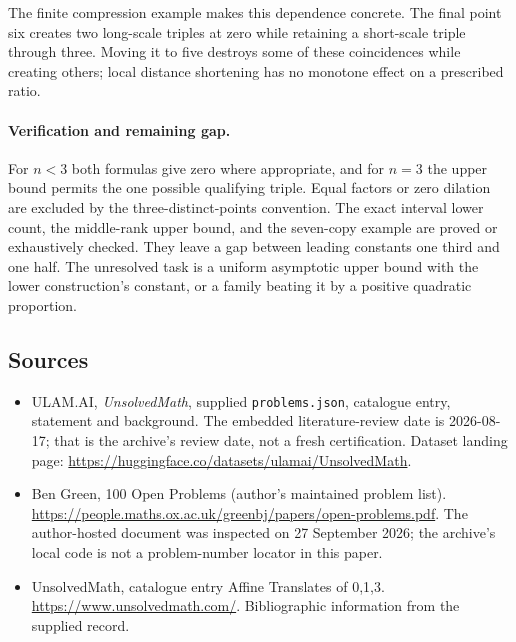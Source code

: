 \documentclass[11pt,a4paper]{article}
\begin{document}
The finite compression example makes this dependence concrete. The final point six creates two long-scale triples at zero while retaining a short-scale triple through three. Moving it to five destroys some of these coincidences while creating others; local distance shortening has no monotone effect on a prescribed ratio.

\paragraph{Verification and remaining gap.}
For $n<3$ both formulas give zero where appropriate, and for $n=3$ the upper bound permits the one possible qualifying triple. Equal factors or zero dilation are excluded by the three-distinct-points convention. The exact interval lower count, the middle-rank upper bound, and the seven-copy example are proved or exhaustively checked. They leave a gap between leading constants one third and one half. The unresolved task is a uniform asymptotic upper bound with the lower construction's constant, or a family beating it by a positive quadratic proportion.

\subsection{Sources}

{\small

\begin{itemize}

\item[\hypertarget{source:statement:1}{S1}] ULAM.AI, \emph{UnsolvedMath}, supplied \texttt{problems.json}, catalogue entry, statement and background. The embedded literature-review date is 2026-08-17; that is the archive’s review date, not a fresh certification. Dataset landing page: \url{https://huggingface.co/datasets/ulamai/UnsolvedMath}.

\item[\hypertarget{source:statement:2}{S2}] Ben Green, 100 Open Problems (author’s maintained problem list). \url{https://people.maths.ox.ac.uk/greenbj/papers/open-problems.pdf}. The author-hosted document was inspected on 27 September 2026; the archive’s local code is not a problem-number locator in this paper.

\item[\hypertarget{source:statement:3}{S3}] UnsolvedMath, catalogue entry Affine Translates of {0,1,3}. \url{https://www.unsolvedmath.com/}. Bibliographic information from the supplied record.

\end{itemize}

}

\label{end:statement}
\end{document}
